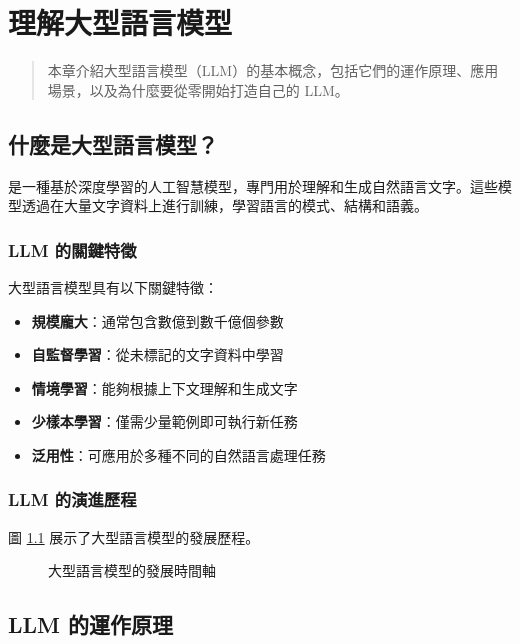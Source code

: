 \chapter{理解大型語言模型}
\label{ch:understanding-llms}

\begin{quote}
本章介紹大型語言模型（LLM）的基本概念，包括它們的運作原理、應用場景，以及為什麼要從零開始打造自己的 LLM。
\end{quote}

\section{什麼是大型語言模型？}

 是一種基於深度學習的人工智慧模型，專門用於理解和生成自然語言文字。這些模型透過在大量文字資料上進行訓練，學習語言的模式、結構和語義。

\subsection{LLM 的關鍵特徵}

大型語言模型具有以下關鍵特徵：

\begin{itemize}
    \item \textbf{規模龐大}：通常包含數億到數千億個參數
    \item \textbf{自監督學習}：從未標記的文字資料中學習
    \item \textbf{情境學習}：能夠根據上下文理解和生成文字
    \item \textbf{少樣本學習}：僅需少量範例即可執行新任務
    \item \textbf{泛用性}：可應用於多種不同的自然語言處理任務
\end{itemize}

\subsection{LLM 的演進歷程}

圖 \ref{fig:llm-timeline} 展示了大型語言模型的發展歷程。

\begin{figure}[H]
    \centering
    \caption{大型語言模型的發展時間軸}
    \label{fig:llm-timeline}
\end{figure}

\section{LLM 的運作原理}

